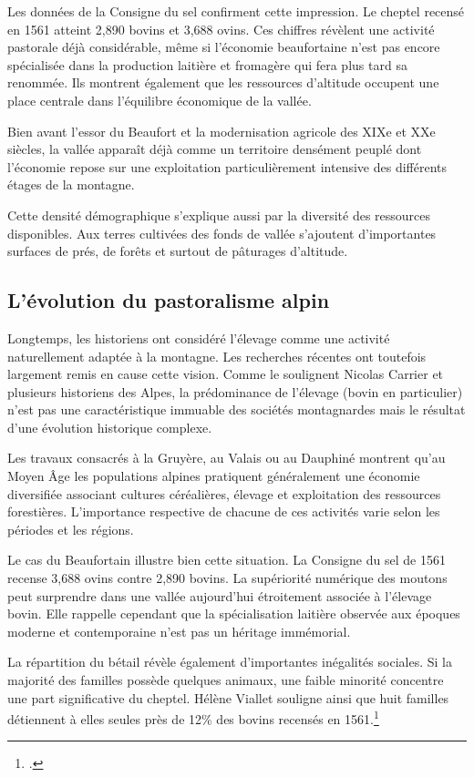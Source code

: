 \documentclass[12pt,a4paper]{report}
\begin{document}
Les données de la Consigne du sel confirment cette impression. Le cheptel recensé en 1561 atteint 2,890 bovins et 3,688 ovins. Ces chiffres révèlent une activité pastorale déjà considérable, même si l'économie beaufortaine n'est pas encore spécialisée dans la production laitière et fromagère qui fera plus tard sa renommée. Ils montrent également que les ressources d'altitude occupent une place centrale dans l'équilibre économique de la vallée.

Bien avant l'essor du Beaufort et la modernisation agricole des XIXe et XXe siècles, la vallée apparaît déjà comme un territoire densément peuplé dont l'économie repose sur une exploitation particulièrement intensive des différents étages de la montagne.


Cette densité démographique s'explique aussi par la diversité des ressources disponibles. Aux terres cultivées des fonds de vallée s'ajoutent d'importantes surfaces de prés, de forêts et surtout de pâturages d'altitude. 



\subsection{L'évolution du pastoralisme alpin}

Longtemps, les historiens ont considéré l'élevage comme une activité naturellement adaptée à la montagne. Les recherches récentes ont toutefois largement remis en cause cette vision. Comme le soulignent Nicolas Carrier et plusieurs historiens des Alpes, la prédominance de l'élevage (bovin en particulier) n'est pas une caractéristique immuable des sociétés montagnardes mais le résultat d'une évolution historique complexe.

Les travaux consacrés à la Gruyère, au Valais ou au Dauphiné montrent qu'au Moyen Âge les populations alpines pratiquent généralement une économie diversifiée associant cultures céréalières, élevage et exploitation des ressources forestières. L'importance respective de chacune de ces activités varie selon les périodes et les régions.

Le cas du Beaufortain illustre bien cette situation. La Consigne du sel de 1561 recense 3,688 ovins contre 2,890 bovins. La supériorité numérique des moutons peut surprendre dans une vallée aujourd'hui étroitement associée à l'élevage bovin. Elle rappelle cependant que la spécialisation laitière observée aux époques moderne et contemporaine n'est pas un héritage immémorial.

La répartition du bétail révèle également d'importantes inégalités sociales. Si la majorité des familles possède quelques animaux, une faible minorité concentre une part significative du cheptel. Hélène Viallet souligne ainsi que huit familles détiennent à elles seules près de 12\% des bovins recensés en 1561.\footcite[90--92]{HViallet1993}
\end{document}

